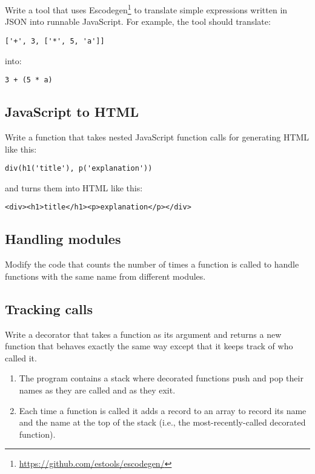 \documentclass[krantzl]{krantz}
\newcommand{\hreffoot}[2]{{#1}\footnote{\href{#2}{#2}}}
\begin{document}
Write a tool that uses \hreffoot{Escodegen}{https://github.com/estools/escodegen/}
to translate simple expressions written in JSON into runnable JavaScript.
For example, the tool should translate:

\begin{lstlisting}[frame=single,frameround=tttt]
['+', 3, ['*', 5, 'a']]
\end{lstlisting}


\noindent into:

\begin{lstlisting}[frame=single,frameround=tttt]
3 + (5 * a)
\end{lstlisting}

\subsection*{JavaScript to HTML}


Write a function that takes nested JavaScript function calls for generating HTML like this:

\begin{lstlisting}[frame=single,frameround=tttt]
div(h1('title'), p('explanation'))
\end{lstlisting}


\noindent and turns them into HTML like this:

\begin{lstlisting}[frame=single,frameround=tttt]
<div><h1>title</h1><p>explanation</p></div>
\end{lstlisting}

\subsection*{Handling modules}


Modify the code that counts the number of times a function is called
to handle functions with the same name from different modules.

\subsection*{Tracking calls}


Write a decorator that takes a function as its argument
and returns a new function that behaves exactly the same way
except that it keeps track of who called it.

\begin{enumerate}

\item 

The program contains a stack where decorated functions push and pop their names
    as they are called and as they exit.



\item 

Each time a function is called
    it adds a record to an array to record its name and the name at the top of the stack
    (i.e., the most-recently-called decorated function).



\end{enumerate}
\end{document}
